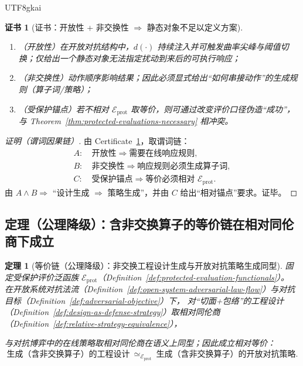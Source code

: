 \documentclass[12pt]{article}
\newtheorem{theorem}{定理}[section]
\newtheorem{certificate}{证书}[section]
\begin{document}
\begin{CJK*}{UTF8}{gkai}
\begin{certificate}[证书：开放性 + 非交换性 $\Rightarrow$ 静态对象不足以定义方案]
\label{cert:design-generation-equals-strategy-generation}
\begin{enumerate}
  \item（开放性）在开放对抗结构中，$d(\cdot)$ 持续注入并可触发曲率尖峰与阈值切换；仅给出一个静态对象无法指定扰动到来后的可执行响应；
  \item（非交换性）动作顺序影响结果；因此必须显式给出“如何串接动作”的生成规则（算子词/策略）；
  \item（受保护锚点）若不相对 $\mathcal{E}_{\mathrm{prot}}$ 取等价，则可通过改变评价口径伪造“成功”，与 Theorem~\ref{thm:protected-evaluations-necessary}
    相冲突。
\end{enumerate}
\end{certificate}

\begin{proof}[证明（谓词因果链）]
由 Certificate~\ref{cert:design-generation-equals-strategy-generation}，取谓词链：
\[
\begin{aligned}
A:&\ \text{开放性}\Rightarrow \text{需要在线响应规则},\\
B:&\ \text{非交换性}\Rightarrow \text{响应规则必须生成算子词},\\
C:&\ \text{受保护锚点}\Rightarrow \text{等价必须相对 }\mathcal{E}_{\mathrm{prot}}.
\end{aligned}
\]
由 $A\wedge B\Rightarrow$ “设计生成 $\Rightarrow$ 策略生成”，并由 $C$ 给出“相对锚点”要求。证毕。
\end{proof}

\subsection{定理（公理降级）：含非交换算子的等价链在相对同伦商下成立}

\begin{theorem}[等价链（公理降级）：非交换工程设计生成与开放对抗策略生成同型]
\label{thm:noncommutative-design-strategy-equivalence}
固定受保护评价泛函族 $\mathcal{E}_{\mathrm{prot}}$（Definition~\ref{def:protected-evaluation-functionals}）。
在开放系统对抗法流（Definition~\ref{def:open-system-adversarial-law-flow}）与对抗目标（Definition~\ref{def:adversarial-objective}）下，
对“切面+包络”的工程设计（Definition~\ref{def:design-as-defense-strategy}）取相对同伦商（Definition~\ref{def:relative-strategy-equivalence}），

与对抗博弈中的在线策略取相对同伦商在语义上同型；因此成立相对等价：
\[
\text{生成（含非交换算子）的工程设计}
\ \simeq_{\mathcal{E}_{\mathrm{prot}}}\
\text{生成（含非交换算子）的开放对抗策略}.
\]
\end{theorem}


\end{CJK*}
\end{document}
